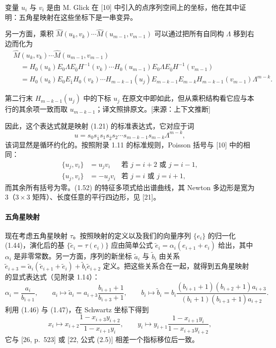变量 $u_i$ 与 $v_i$ 是由 M. Glick 在 [10] 中引入的点序列空间上的坐标，他在其中证明：五角星映射在这些坐标下是一串变异。

另一方面，乘积 $\hat M(u_k,v_k)\cdots\hat M(u_{m-1},v_{m-1})$ 可以通过把所有自同构 $\Lambda$ 移到右边而化为
\begin{equation}
\begin{aligned}
&\hat M(u_k,v_k)\cdots\hat M(u_{m-1},v_{m-1})\\
&\quad=H_0(u_k)E_0\Lambda E_{\bar0}H^{-1}(v_k)\cdots H_0(u_{m-1})E_0\Lambda E_{\bar0}H^{-1}(v_{m-1})\\
&\quad=H_0(u_k)E_0E_{\bar1}H_0(v_k)\cdots H_{m-k-1}(u_j)E_{m-k-1}E_{m-k}H_{m-k-1}(v_{m-1})\Lambda^{m-k}.
\end{aligned}
\tag{1.52}\label{eq:1.52}
\end{equation}
\begin{annote}第二行末 $H_{m-k-1}(u_j)$ 中的下标 $u_j$ 在原文中即如此，但从乘积结构看它应与本行的其余项一致而取 $u_{m-k-1}$；译文照排原文。[来源：上下文推断]
\end{annote}

因此，这个表达式就是映射 (1.21) 的标准表达式，它对应于词
\[
u=s_0s_{\bar1}s_1s_{\bar2}s_2\cdots s_{m-k-1}s_{m-k}\Lambda^{m-k},
\]
该词显然是循环约化的。按照附录 1.11 的标准规则，Poisson 括号与 [10] 中的相同：
\begin{equation}
\begin{aligned}
\{u_j,v_i\}&=u_jv_i &\text{若 } j=i+2 \text{ 或 } j=i-1,\\
\{u_j,v_i\}&=-u_jv_i &\text{若 } j=i \text{ 或 } j=i+1,
\end{aligned}
\tag{1.53}\label{eq:1.53}
\end{equation}
而其余所有括号为零。(1.52) 的特征多项式给出谱曲线，其 Newton 多边形是宽为 3（$3\times3$ 矩阵）、长度任意的平行四边形，见 [21]。

\paragraph{五角星映射}
现在考虑五角星映射 $\tau$。按照映射的定义以及我们的向量序列 $\{e_i\}$ 的归一化 (1.44)，演化后的基 $\{\tilde e_i=\tau(e_i)\}$ 应由简单公式 $\tilde e_i=\alpha_i(e_{i+1}+e_i)$ 给出，其中 $\alpha_i$ 是非零常数。另一方面，序列的新坐标 $\tilde a_i$ 与 $\tilde b_i$ 由关系 $\tilde e_{i+3}=\tilde a_i(\tilde e_{i+1}+\tilde e_i)+\tilde b_i\tilde e_{i+2}$ 定义。把这些关系合在一起，就得到五角星映射的显式表达式（见附录 1.14）：
\begin{equation}
\alpha_i=\frac{a_i}{b_{i+1}},\qquad
a_i\mapsto\tilde a_i=a_{i+3}\frac{b_{i+1}+1}{b_{i+3}+1},\qquad
b_i\mapsto\tilde b_i=b_i\frac{(b_{i+1}+1)(b_{i+2}+1)a_{i+3}}{(b_i+1)(b_{i+3}+1)a_{i+2}}.
\tag{1.54}\label{eq:1.54}
\end{equation}
利用 (1.46) 与 (1.47)，在 Schwartz 坐标下得到
\begin{equation}
x_i\mapsto x_{i+2}\frac{1-x_{i+3}y_{i+2}}{1-x_{i+1}y_i},\qquad
y_i\mapsto y_{i+1}\frac{1-x_{i+1}y_i}{1-x_{i+3}y_{i+2}},
\tag{1.55}\label{eq:1.55}
\end{equation}
它与 [26, p.~523] 或 [22, 公式 (2.5)] 相差一个指标移位后一致。

